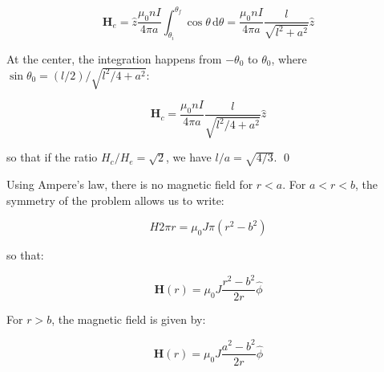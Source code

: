 \documentclass[12pt]{article}
\begin{document}
\begin{equation}
    \mathbf{H}_{e} = \hat{z} \frac{\mu_{0}nI}{4\pi a} \int_{\theta_{i}}^{\theta_{f}} \cos{\theta} \, \mathrm{d}\theta = \frac{\mu_{0}nI}{4\pi a} \frac{l}{\sqrt{l^{2} + a^{2}}} \hat{z}
\end{equation}

At the center, the integration happens from $-\theta_{0}$ to $\theta_{0}$, where $\sin{\theta_{0}} = (l/2)/\sqrt{l^2/4 + a^{2}}$:

\begin{equation}
    \mathbf{H}_{c} = \frac{\mu_{0}nI}{4\pi a} \frac{l}{\sqrt{l^{2}/4 + a^{2}}} \hat{z}
\end{equation}

so that if the ratio $H_{c}/H_{e} = \sqrt{2}$, we have $l/a = \sqrt{4/3}$.
\qed



Using Ampere's law, there is no magnetic field for $r < a$. For $a < r < b$, the symmetry of the problem allows us to write:

\begin{equation}
    H 2\pi r = \mu_{0} J \pi (r^{2} - b^{2})
\end{equation}

so that:

\begin{equation}
    \mathbf{H}(r) = \mu_{0} J \frac{r^{2} - b^{2}}{2r} \hat{\phi}
\end{equation}

For $r > b$, the magnetic field is given by:

\begin{equation}
    \mathbf{H}(r) = \mu_{0} J \frac{a^{2} - b^{2}}{2r} \hat{\phi}
\end{equation}


\begin{center}
    
\end{center}
\end{document}
